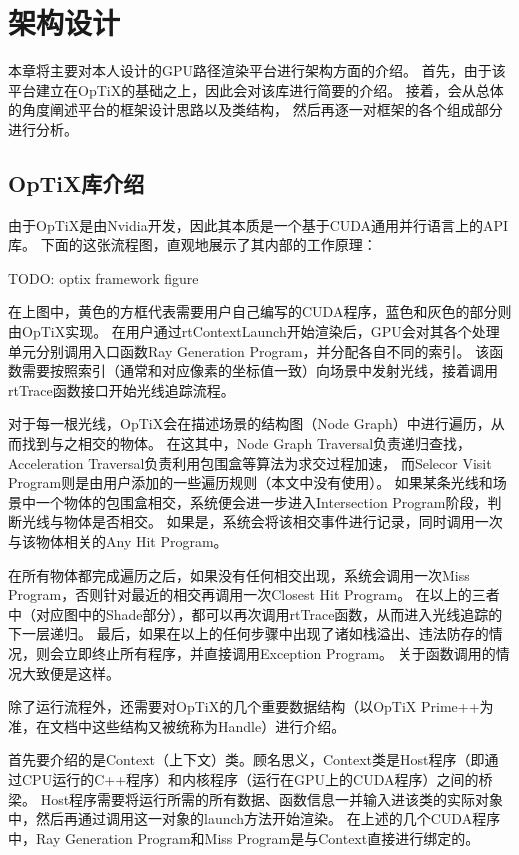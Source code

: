 \chapter{架构设计}
\label{cha:pipeline}

本章将主要对本人设计的GPU路径渲染平台进行架构方面的介绍。
首先，由于该平台建立在OpTiX的基础之上，因此会对该库进行简要的介绍。
接着，会从总体的角度阐述平台的框架设计思路以及类结构，
然后再逐一对框架的各个组成部分进行分析。

\section{OpTiX库介绍}

由于OpTiX是由Nvidia开发，因此其本质是一个基于CUDA通用并行语言上的API库。
下面的这张流程图，直观地展示了其内部的工作原理：

TODO: optix framework figure

在上图中，黄色的方框代表需要用户自己编写的CUDA程序，蓝色和灰色的部分则由OpTiX实现。
在用户通过rtContextLaunch开始渲染后，GPU会对其各个处理单元分别调用入口函数Ray Generation Program，并分配各自不同的索引。
该函数需要按照索引（通常和对应像素的坐标值一致）向场景中发射光线，接着调用rtTrace函数接口开始光线追踪流程。

对于每一根光线，OpTiX会在描述场景的结构图（Node Graph）中进行遍历，从而找到与之相交的物体。
在这其中，Node Graph Traversal负责递归查找，Acceleration Traversal负责利用包围盒等算法为求交过程加速，
而Selecor Visit Program则是由用户添加的一些遍历规则（本文中没有使用）。
如果某条光线和场景中一个物体的包围盒相交，系统便会进一步进入Intersection Program阶段，判断光线与物体是否相交。
如果是，系统会将该相交事件进行记录，同时调用一次与该物体相关的Any Hit Program。

在所有物体都完成遍历之后，如果没有任何相交出现，系统会调用一次Miss Program，否则针对最近的相交再调用一次Closest Hit Program。
在以上的三者中（对应图中的Shade部分），都可以再次调用rtTrace函数，从而进入光线追踪的下一层递归。
最后，如果在以上的任何步骤中出现了诸如栈溢出、违法防存的情况，则会立即终止所有程序，并直接调用Exception Program。
关于函数调用的情况大致便是这样。

除了运行流程外，还需要对OpTiX的几个重要数据结构（以OpTiX Prime++为准，在文档中这些结构又被统称为Handle）进行介绍。

首先要介绍的是Context（上下文）类。顾名思义，Context类是Host程序（即通过CPU运行的C++程序）和内核程序（运行在GPU上的CUDA程序）之间的桥梁。
Host程序需要将运行所需的所有数据、函数信息一并输入进该类的实际对象中，然后再通过调用这一对象的launch方法开始渲染。
在上述的几个CUDA程序中，Ray Generation Program和Miss Program是与Context直接进行绑定的。

